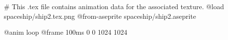 # This .tex file contains animation data for the associated texture.
@load spaceship/ship2.tex.png
@from-aseprite spaceship/ship2.aseprite

@anim loop
	@frame 100ms 0 0 1024 1024
